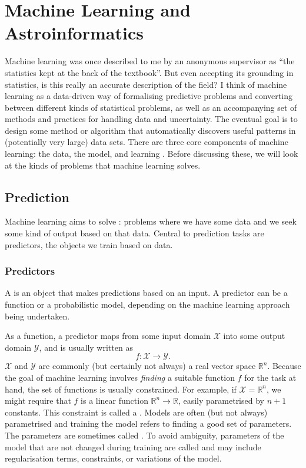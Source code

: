 \chapter{Machine Learning and Astroinformatics}
\label{cha:background-ml}

Machine learning was once described to me by an anonymous supervisor as ``the statistics kept at the back of the textbook''. But even accepting its grounding in statistics, is this really an accurate description of the field? I think of machine learning as a data-driven way of formalising predictive problems and converting between different kinds of statistical problems, as well as an accompanying set of methods and practices for handling data and uncertainty. The eventual goal is to design some method or algorithm that automatically discovers useful patterns in (potentially very large) data sets. There are three core components of machine learning: the data, the model, and learning \citep{deisenroth_mathematics_2020}. Before discussing these, we will look at the kinds of problems that machine learning solves.
    
\section{Prediction}

    Machine learning aims to solve : problems where we have some data and we seek some kind of output based on that data. Central to prediction tasks are predictors, the objects we train based on data.

    \subsection{Predictors}
    \label{sec:predictors}
        A  is an object that makes predictions based on an input. A predictor can be a function or a probabilistic model, depending on the machine learning approach being undertaken.

        As a function, a predictor maps from some input domain $\mathcal X$ into some output domain $\mathcal Y$, and is usually written as
        \begin{equation}
            f : \mathcal X \to \mathcal Y.
        \end{equation}
        $\mathcal X$ and $\mathcal Y$ are commonly (but certainly not always) a real vector space $\mathbb R^n$. Because the goal of machine learning involves \emph{finding} a suitable function $f$ for the task at hand, the set of functions is usually constrained. For example, if $\mathcal X = \mathbb{R}^n$, we might require that $f$ is a linear function $\mathbb R^n \to \mathbb R$, easily parametrised by $n + 1$ constants. This constraint is called a . Models are often (but not always) parametrised and training the model refers to finding a good set of parameters. The parameters are sometimes called . To avoid ambiguity, parameters of the model that are not changed during training are called  and may include regularisation terms, constraints, or variations of the model.

